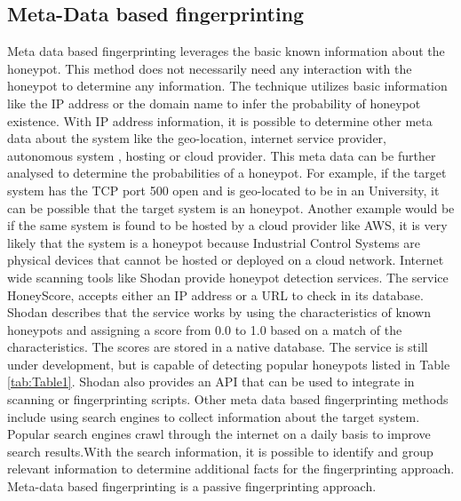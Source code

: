 \documentclass[letterpaper, 10 pt, conference]{ieeeconf}  %
\begin{document}
\subsection{Meta-Data based fingerprinting}
Meta data based fingerprinting leverages the basic known information about the honeypot. This method does not necessarily need any interaction with the honeypot to determine any information. The technique utilizes basic information like the IP address or the domain name to infer the probability of honeypot existence. With IP address information, it is possible to determine other meta data about the system like the geo-location, internet service provider, autonomous system , hosting or cloud provider. This meta data can be further analysed to determine the probabilities of a honeypot. For example, if the target system has the TCP port 500 open and is geo-located to be in an University, it can be possible that the target system is an honeypot. Another example would be if the same system is found to be hosted by a cloud provider like AWS, it is very likely that the system is a honeypot because Industrial Control Systems are physical devices that cannot be hosted or deployed on a cloud network.
Internet wide scanning tools like Shodan provide honeypot detection services. The service HoneyScore, accepts either an IP address or a URL to check in its database. Shodan describes that the service works by using the characteristics of known honeypots and assigning a score from 0.0 to 1.0 based on a match of the characteristics. The scores are stored in a native database. The service is still under development, but is capable of detecting popular honeypots listed in Table \ref{tab:Table1}. Shodan also provides an API that can be used to integrate in scanning or fingerprinting scripts. Other meta data based fingerprinting methods include using search engines to collect information about the target system. Popular search engines crawl through the internet on a daily basis to improve search results.With the search information, it is possible to identify and group relevant information to determine additional facts for the fingerprinting approach. Meta-data based fingerprinting is a passive fingerprinting approach.
\end{document}

